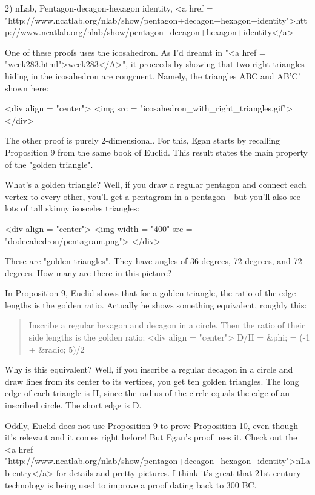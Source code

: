 2) nLab, Pentagon-decagon-hexagon identity, 
<a href = "http://www.ncatlab.org/nlab/show/pentagon+decagon+hexagon+identity">http://www.ncatlab.org/nlab/show/pentagon+decagon+hexagon+identity</a>

One of these proofs uses the icosahedron.  As I'd dreamt in "<a
href = "week283.html">week283</A>", it proceeds by showing that
two right triangles hiding in the icosahedron are congruent.
Namely, the triangles ABC and AB'C' shown here:

<div align = "center">
<img src = "icosahedron_with_right_triangles.gif">
</div>

The other proof is purely 2-dimensional.  For this, Egan starts
by recalling Proposition 9 from the same book of Euclid.  This result
states the main property of the "golden triangle".

What's a golden triangle?  Well, if you draw a regular pentagon and
connect each vertex to every other, you'll get a pentagram in a
pentagon - but you'll also see lots of tall skinny isosceles
triangles:

<div align = "center">
<img width = "400" src = "dodecahedron/pentagram.png">
</div>


These are "golden triangles".  They have angles
of 36 degrees, 72 degrees, and 72 degrees.  How many are there
in this picture?

In Proposition 9, Euclid shows that for a golden triangle, the ratio
of the edge lengths is the golden ratio.  Actually he shows something
equivalent, roughly this:

\begin{quote}
 Inscribe a regular hexagon and decagon in a circle.  Then the ratio
 of their side lengths is the golden ratio: 
<div align = "center">
D/H = &phi; = (-1 + &radic; 5)/2
\end{quote}
    

Why is this equivalent?  Well, if you inscribe a regular decagon in a
circle and draw lines from its center to its vertices, you get ten
golden triangles.  The long edge of each triangle is H, since the
radius of the circle equals the edge of an inscribed circle.  The
short edge is D.

Oddly, Euclid does not use Proposition 9 to prove Proposition 10, even
though it's relevant and it comes right before!  But Egan's proof uses
it.  Check out the <a href =
"http://www.ncatlab.org/nlab/show/pentagon+decagon+hexagon+identity">nLab
entry</a> for details and pretty pictures.  I think it's great that
21st-century technology is being used to improve a proof dating back to 300 BC.

